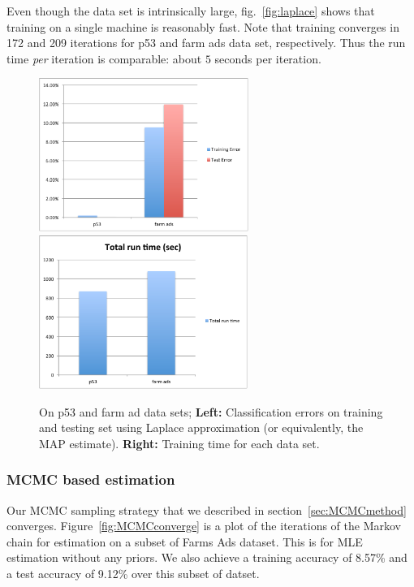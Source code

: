 Even though the data set is intrinsically large, fig.~\ref{fig:laplace} shows
that training on a single machine is reasonably fast. Note that training
converges in 172 and 209 iterations for p53 and farm ads data set,
respectively. Thus the run time {\em per} iteration is comparable: about $5$
seconds per iteration.


\begin{figure}[t]
\label{fig:laplace}
\centering
\includegraphics[height=5.0cm]{../../results/classificaiton_errors.pdf}
\includegraphics[height=5.0cm]{../../results/runtime.pdf}

\caption{\small On p53 and farm ad data sets; {\bf Left:} Classification errors on
training and testing set using Laplace approximation (or equivalently, the
MAP estimate). {\bf Right:} Training time for each data set. }

\label{graphlab}
\end{figure}

\subsubsection{MCMC based estimation}
Our MCMC sampling strategy that we described in section~\ref{sec:MCMCmethod}
converges. Figure~\ref{fig:MCMCconverge} is a plot of the iterations of the Markov 
chain for estimation on a subset of Farms Ads dataset. This is for MLE
estimation without any priors. We also achieve a training  accuracy of 8.57\%
and a test accuracy of 9.12\% over this subset of datset.  

